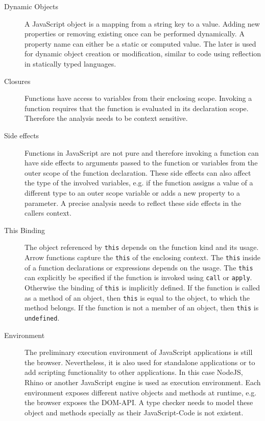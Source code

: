 \begin{description}
	\item[Dynamic Objects] A JavaScript object is a mapping from a string key to a value. Adding new properties or removing existing once can be performed dynamically. A property name can either be a static or computed value. The later is used for dynamic object creation or modification, similar to code using reflection in statically typed languages. 
	
	\item[Closures] Functions have access to variables from their enclosing scope. Invoking a function requires that the function is evaluated in its declaration scope. Therefore the analysis needs to be context sensitive.

	\item[Side effects] Functions in JavaScript are not pure and therefore invoking a function can have side effects to arguments passed to the function or variables from the outer scope of the function declaration. These side effects can also affect the type of the involved variables, e.g. if the function assigns a value of a different type to an outer scope variable or adds a new property to a parameter. A precise analysis needs to reflect these side effects in the callers context.
	
	\item[This Binding] The object referenced by \texttt{this} depends on the  function kind and its usage. Arrow functions capture the \texttt{this} of the enclosing context. The \texttt{this} inside of a function declarations or expressions depends on the usage. The \texttt{this} can explicitly be specified if the function is invoked using \texttt{call} or \texttt{apply}. Otherwise the binding of \texttt{this} is implicitly defined. If the function is called as a method of an object, then \texttt{this} is equal to the object, to which the method belongs. If the function is not a member of an object, then \texttt{this} is \texttt{undefined}. 

	\item[Environment] The preliminary execution environment of JavaScript applications is still the browser. Nevertheless, it is also used for standalone applications or to add scripting functionality to other applications. In this case NodeJS, Rhino or another JavaScript engine is used as execution environment. Each environment exposes different native objects and methods at runtime, e.g. the browser exposes the DOM-API. A type checker needs to model these object and methods specially as their JavaScript-Code is not existent.
\end{description}

